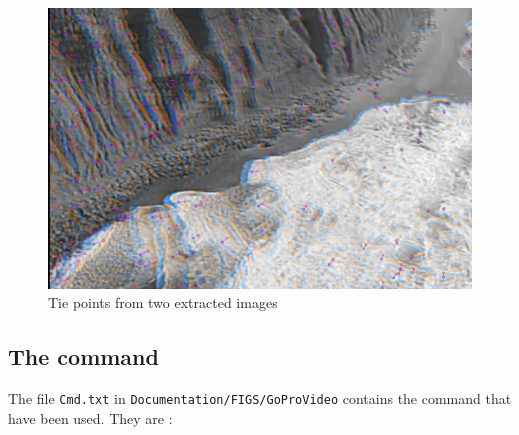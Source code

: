 \begin{figure}
\centering
\includegraphics[width=0.90\linewidth]{FIGS/GoProVideo/SIFT.jpg}
\caption{Tie points from  two extracted images}
\label{fig:GoProSIFT}
\end{figure}


\subsection{The command}\label{GoProVideo:Commands}

The file {\tt Cmd.txt} in {\tt Documentation/FIGS/GoProVideo} contains the  command that have been used. They are :

